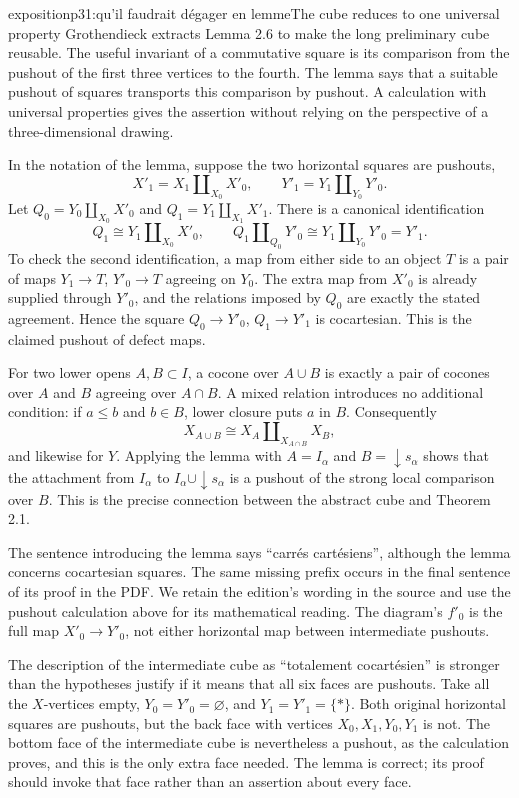 \begin{dcomment}{exposition}{p31:qu'il faudrait dégager en lemme}{The cube reduces to one universal property}
Grothendieck extracts Lemma 2.6 to make the long preliminary cube reusable. The useful invariant of a commutative square is its comparison from the pushout of the first three vertices to the fourth. The lemma says that a suitable pushout of squares transports this comparison by pushout. A calculation with universal properties gives the assertion without relying on the perspective of a three-dimensional drawing.

In the notation of the lemma, suppose the two horizontal squares are pushouts,
\[
 X'_1=X_1\amalg_{X_0}X'_0,
 \qquad Y'_1=Y_1\amalg_{Y_0}Y'_0.
\]
Let $Q_0=Y_0\amalg_{X_0}X'_0$ and $Q_1=Y_1\amalg_{X_1}X'_1$. There is a canonical identification
\[
 Q_1\cong Y_1\amalg_{X_0}X'_0,
 \qquad Q_1\amalg_{Q_0}Y'_0
       \cong Y_1\amalg_{Y_0}Y'_0=Y'_1.
\]
To check the second identification, a map from either side to an object $T$ is a pair of maps $Y_1\to T$, $Y'_0\to T$ agreeing on $Y_0$. The extra map from $X'_0$ is already supplied through $Y'_0$, and the relations imposed by $Q_0$ are exactly the stated agreement. Hence the square $Q_0\to Y'_0$, $Q_1\to Y'_1$ is cocartesian. This is the claimed pushout of defect maps.

For two lower opens $A,B\subset I$, a cocone over $A\cup B$ is exactly a pair of cocones over $A$ and $B$ agreeing over $A\cap B$. A mixed relation introduces no additional condition: if $a\leq b$ and $b\in B$, lower closure puts $a$ in $B$. Consequently
\[
 X_{A\cup B}\cong X_A\amalg_{X_{A\cap B}}X_B,
\]
and likewise for $Y$. Applying the lemma with $A=I_\alpha$ and $B=\downarrow s_\alpha$ shows that the attachment from $I_\alpha$ to $I_\alpha\cup\downarrow s_\alpha$ is a pushout of the strong local comparison over $B$. This is the precise connection between the abstract cube and Theorem 2.1.

The sentence introducing the lemma says ``carr\'es cart\'esiens'', although the lemma concerns cocartesian squares. The same missing prefix occurs in the final sentence of its proof in the PDF. We retain the edition's wording in the source and use the pushout calculation above for its mathematical reading. The diagram's $f'_0$ is the full map $X'_0\to Y'_0$, not either horizontal map between intermediate pushouts.

The description of the intermediate cube as ``totalement cocart\'esien'' is stronger than the hypotheses justify if it means that all six faces are pushouts. Take all the $X$-vertices empty, $Y_0=Y'_0=\varnothing$, and $Y_1=Y'_1=\{*\}$. Both original horizontal squares are pushouts, but the back face with vertices $X_0,X_1,Y_0,Y_1$ is not. The bottom face of the intermediate cube is nevertheless a pushout, as the calculation proves, and this is the only extra face needed. The lemma is correct; its proof should invoke that face rather than an assertion about every face.
\end{dcomment}

